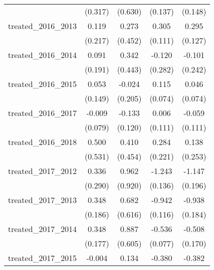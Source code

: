 {\begin{tabular}{l*{4}{c}}
            &     (0.317)         &     (0.630)         &     (0.137)         &     (0.148)         \\
[1em]
treated\_2016\_2013&       0.119         &       0.273         &       0.305\sym{**} &       0.295\sym{*}  \\
            &     (0.217)         &     (0.452)         &     (0.111)         &     (0.127)         \\
[1em]
treated\_2016\_2014&       0.091         &       0.342         &      -0.120         &      -0.101         \\
            &     (0.191)         &     (0.443)         &     (0.282)         &     (0.242)         \\
[1em]
treated\_2016\_2015&       0.053         &      -0.024         &       0.115         &       0.046         \\
            &     (0.149)         &     (0.205)         &     (0.074)         &     (0.074)         \\
[1em]
treated\_2016\_2017&      -0.009         &      -0.133         &       0.006         &      -0.059         \\
            &     (0.079)         &     (0.120)         &     (0.111)         &     (0.111)         \\
[1em]
treated\_2016\_2018&       0.500         &       0.410         &       0.284         &       0.138         \\
            &     (0.531)         &     (0.454)         &     (0.221)         &     (0.253)         \\
[1em]
treated\_2017\_2012&       0.336         &       0.962         &      -1.243\sym{***}&      -1.147\sym{***}\\
            &     (0.290)         &     (0.920)         &     (0.136)         &     (0.196)         \\
[1em]
treated\_2017\_2013&       0.348         &       0.682         &      -0.942\sym{***}&      -0.938\sym{***}\\
            &     (0.186)         &     (0.616)         &     (0.116)         &     (0.184)         \\
[1em]
treated\_2017\_2014&       0.348\sym{*}  &       0.887         &      -0.536\sym{***}&      -0.508\sym{**} \\
            &     (0.177)         &     (0.605)         &     (0.077)         &     (0.170)         \\
[1em]
treated\_2017\_2015&      -0.004         &       0.134         &      -0.380\sym{***}&      -0.382\sym{**} \\

\end{tabular}}
